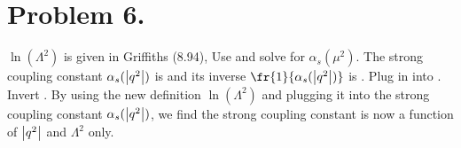 \documentclass{article}
\begin{document}
\section*{Problem 6.}
$\ln(\Lambda^2)$ is given in Griffiths (8.94),
Use  and solve for $\alpha_s(\mu^2)$.
The strong coupling constant $\alpha_s(\left| q^2 \right|)$ is  and its inverse $\fr{1}{\alpha_s(\abs{q^2})}$ is . Plug in  into .
Invert .
By using the new definition $\ln(\Lambda^2)$ and plugging it into the strong coupling constant $\alpha_s(\left| q^2 \right|)$, we find the strong coupling constant is now a function of $\left| q^2 \right|$ and $\Lambda^2$ only.
\end{document}
